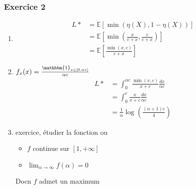 \documentclass{article}
\theoremstyle{plain}%
\theoremstyle{definition}
\theoremstyle{remark}
\begin{document}
\subsubsection{Exercice 2}
\begin{enumerate}
    \item \begin{align*}
        L* &= \mathbb{E}[\min(\eta (X) , 1 - \eta (X))] \\
            &= \mathbb{E}[\min (\frac{x}{c+x} , \frac{c}{c+x})] \\ 
            &= \mathbb{E}[ \frac{\min (x,c)}{ c+x}]
    \end{align*}
    \item $ f_x(x) = \frac{\mathbbm{1}_{x \in [0, \alpha c]}}{\alpha c} $ 
    \begin{align*}
        L* &= \int_{0}^{\alpha c} \frac{\min (x,c)}{x + c} \frac{dx}{\alpha c} \\
            &= \int_{0}^{c} \frac{x}{x+c} \frac{dx}{\alpha c} \\ 
            &= \frac{1}{\alpha } \log_{} ( \frac{(\alpha +1) e}{4})
    \end{align*} 
    \item exercice, étudier la fonction ou \begin{itemize}
        \item $ f $ continue sur $ [1, +\infty ] $ 
        \item $ \lim_{\alpha  \to \infty} f(\alpha ) = 0 $ 
    \end{itemize}
    Docn $ f $ admet un maximum 
\end{enumerate}
\end{document}
